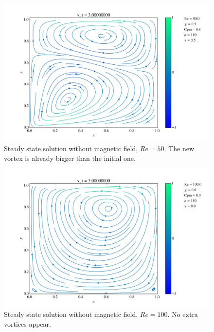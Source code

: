 \documentclass[journal]{IEEEtran}
\begin{document}
\begin{figure}[!t]
\centering
\includegraphics[width=\linewidth]{figures/Re050/w/vectorField}
\caption{Steady state solution without magnetic field, $\mathit{Re}=50$. The new vortex is already bigger than the initial one. \label{Re050wVectorField}}
\end{figure}

\begin{figure}[!t]
\centering
\includegraphics[width=\linewidth]{figures/Re100/n/vectorField}
\caption{Steady state solution without magnetic field, $\mathit{Re}=100$. No extra vortices appear. \label{Re100nVectorField}}
\end{figure}
\end{document}
